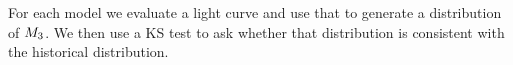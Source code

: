 
For each model we evaluate a light curve and use that to generate a distribution of $M_{3}$.  We then use a KS test to ask whether that distribution is consistent with the historical distribution.

